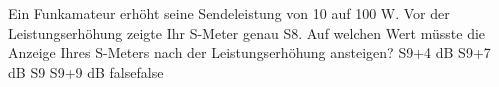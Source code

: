     {Ein Funkamateur erhöht seine Sendeleistung von 10 auf 100 W. Vor der Leistungserhöhung zeigte Ihr S-Meter genau S8. Auf welchen Wert müsste die Anzeige Ihres S-Meters nach der Leistungserhöhung ansteigen?}
    {S9+4 dB}
    {S9+7 dB}
    {S9}
    {S9+9 dB}
    {false}{false}